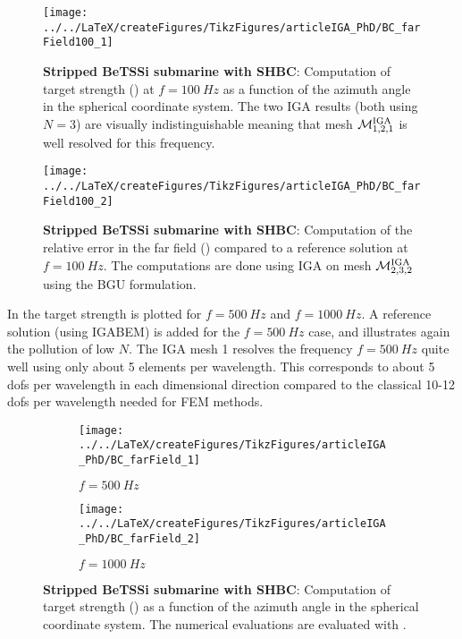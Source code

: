 \begin{figure}
	\centering    
	\texttt{[image: ../../LaTeX/createFigures/TikzFigures/articleIGA\_PhD/BC\_farField100\_1]}
	\caption{\textbf{Stripped BeTSSi submarine with SHBC}: Computation of target strength () at $f=\SI{100}{Hz}$ as a function of the azimuth angle in the spherical coordinate system. The two IGA results (both using $N=3$) are visually indistinguishable meaning that mesh ${\cal M}_{1,2,1}^{\mathrm{IGA}}$ is well resolved for this frequency.}
	\label{Fig2:FarField100}
\end{figure}
\begin{figure}
	\centering    
	\texttt{[image: ../../LaTeX/createFigures/TikzFigures/articleIGA\_PhD/BC\_farField100\_2]}
	\caption{\textbf{Stripped BeTSSi submarine with SHBC}: Computation of the relative error in the far field () compared to a reference solution at $f=\SI{100}{Hz}$. The computations are done using IGA on mesh ${\cal M}_{2,3,2}^{\mathrm{IGA}}$ using the BGU formulation.}
	\label{Fig2:FarField100error}
\end{figure}
In  the target strength is plotted for $f=\SI{500}{Hz}$ and $f=\SI{1000}{Hz}$. A reference solution (using IGABEM) is added for the $f=\SI{500}{Hz}$ case, and illustrates again the pollution of low $N$. The IGA mesh 1 resolves the frequency $f=\SI{500}{Hz}$ quite well using only about 5 elements per wavelength. This corresponds to about 5 dofs per wavelength in each dimensional direction compared to the classical 10-12 dofs per wavelength needed for FEM methods.
\begin{figure}
	\centering    
	\begin{subfigure}[b]{\textwidth}
		\centering
		\texttt{[image: ../../LaTeX/createFigures/TikzFigures/articleIGA\_PhD/BC\_farField\_1]}
		\caption{$f=\SI{500}{Hz}$}
	\end{subfigure}
	\par\bigskip
	\par\bigskip
	\begin{subfigure}[b]{\textwidth}
		\centering
		\texttt{[image: ../../LaTeX/createFigures/TikzFigures/articleIGA\_PhD/BC\_farField\_2]}
		\caption{$f=\SI{1000}{Hz}$}
	\end{subfigure}
	\caption{\textbf{Stripped BeTSSi submarine with SHBC}: Computation of target strength () as a function of the azimuth angle in the spherical coordinate system. The numerical evaluations are evaluated with .}
	\label{Fig2:FarField}
\end{figure}
